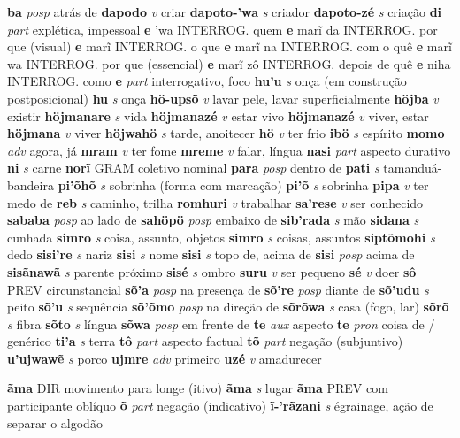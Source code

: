 \textbf{ba} \textit{posp} {atrás de}
\textbf{dapodo} \textit{v} {criar}
\textbf{dapoto-'wa} \textit{s} {criador}
\textbf{dapoto-zé} \textit{s} {criação}
\textbf{di} \textit{part} {explética, impessoal}
\textbf{e} {'wa} {INTERROG. quem}
\textbf{e} {marĩ} {da INTERROG. por que (visual)}
\textbf{e} {marĩ} {INTERROG. o que}
\textbf{e} {marĩ} {na INTERROG. com o quê}
\textbf{e} {marĩ} {wa INTERROG. por que (essencial)}
\textbf{e} {marĩ} {zô INTERROG. depois de quê}
\textbf{e} {niha} {INTERROG. como}
\textbf{e} \textit{part} {interrogativo, foco}
\textbf{hu'u} \textit{s} {onça (em construção postposicional)}
\textbf{hu} \textit{s} {onça}
\textbf{hö-upsõ} \textit{v} {lavar pele, lavar superficialmente}
\textbf{höjba} \textit{v} {existir}
\textbf{höjmanare} \textit{s} {vida}
\textbf{höjmanazé} \textit{v} {estar vivo}
\textbf{höjmanazé} \textit{v} {viver, estar}
\textbf{höjmana} \textit{v} {viver}
\textbf{höjwahö} \textit{s} {tarde, anoitecer}
\textbf{hö} \textit{v} {ter frio}
\textbf{ibö} \textit{s} {espírito}
\textbf{momo} \textit{adv} {agora, já}
\textbf{mram} \textit{v} {ter fome}
\textbf{mreme} \textit{v} {falar, língua}
\textbf{nasi} \textit{part} {aspecto durativo}
\textbf{ni} \textit{s} {carne}
\textbf{norĩ} {GRAM} {coletivo nominal}
\textbf{para} \textit{posp} {dentro de}
\textbf{pati} \textit{s} {tamanduá-bandeira}
\textbf{pi'õhõ} \textit{s} {sobrinha (forma com marcação)}
\textbf{pi'õ} \textit{s} {sobrinha}
\textbf{pipa} \textit{v} {ter medo de}
\textbf{reb} \textit{s} {caminho, trilha}
\textbf{romhuri} \textit{v} {trabalhar}
\textbf{sa'rese} \textit{v} {ser conhecido}
\textbf{sababa} \textit{posp} {ao lado de}
\textbf{sahöpö} \textit{posp} {embaixo de}
\textbf{sib'rada} \textit{s} {mão}
\textbf{sidana} \textit{s} {cunhada}
\textbf{simro} \textit{s} {coisa, assunto, objetos}
\textbf{simro} \textit{s} {coisas, assuntos}
\textbf{siptõmohi} \textit{s} {dedo}
\textbf{sisi're} \textit{s} {nariz}
\textbf{sisi} \textit{s} {nome}
\textbf{sisi} \textit{s} {topo de, acima de}
\textbf{sisi} \textit{posp} {acima de}
\textbf{sisãnawã} \textit{s} {parente próximo}
\textbf{sisé} \textit{s} {ombro}
\textbf{suru} \textit{v} {ser pequeno}
\textbf{sé} \textit{v} {doer}
\textbf{sô} {PREV} {circunstancial}
\textbf{sõ'a} \textit{posp} {na presença de}
\textbf{sõ're} \textit{posp} {diante de}
\textbf{sõ'udu} \textit{s} {peito}
\textbf{sõ'u} \textit{s} {sequência}
\textbf{sõ'õmo} \textit{posp} {na direção de}
\textbf{sõrõwa} \textit{s} {casa (fogo, lar)}
\textbf{sõrõ} \textit{s} {fibra}
\textbf{sõto} \textit{s} {língua}
\textbf{sõwa} \textit{posp} {em frente de}
\textbf{te} \textit{aux} {aspecto}
\textbf{te} \textit{pron} {coisa de / genérico}
\textbf{ti'a} \textit{s} {terra}
\textbf{tô} \textit{part} {aspecto factual}
\textbf{tõ} \textit{part} {negação (subjuntivo)}
\textbf{u'ujwawẽ} \textit{s} {porco}
\textbf{ujmre} \textit{adv} {primeiro}
\textbf{uzé} \textit{v} {amadurecer}


\textbf{ãma} {DIR} {movimento para longe (itivo)}
\textbf{ãma} \textit{s} {lugar}
\textbf{ãma} {PREV} {com participante oblíquo}
\textbf{õ} \textit{part} {negação (indicativo)}
\textbf{ĩ-'rãzani} \textit{s} {égrainage, ação de separar o algodão}